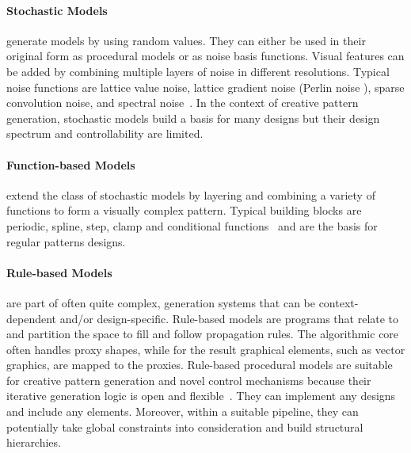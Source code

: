 \paragraph*{Stochastic Models} generate models by using random values. They can either be used in their original form as procedural models or as noise basis functions. Visual features can be added by combining multiple layers of noise in different resolutions. Typical noise functions are lattice value noise, lattice gradient noise (\eg Perlin noise \cite{perlin_1985_ais}), sparse convolution noise, and spectral noise~\cite{ebert_2003_tmp,lagae_2010_sap}. 
In the context of creative pattern generation, stochastic models build a basis for many designs but their design spectrum and controllability are limited.

\paragraph*{Function-based Models} extend the class of stochastic models by layering and combining a variety of functions to form a visually complex pattern. Typical building blocks are periodic, spline, step, clamp and conditional functions~\cite{ebert_2003_tmp} and are the basis for regular patterns designs. 


\paragraph*{Rule-based Models} are part of often quite complex, generation systems that can be context-dependent and/or design-specific. Rule-based models are programs that relate to and partition the space to fill and follow propagation rules. The algorithmic core often handles proxy shapes, while for the result graphical elements, such as vector graphics, are mapped to the proxies. Rule-based procedural models are suitable for creative pattern generation and novel control mechanisms because their iterative generation logic is open and flexible~\cite{wong_1998_cgf, mech_2012_tdf}. They can implement any designs and include any elements. Moreover, within a suitable pipeline, they can potentially take global constraints into consideration and build structural hierarchies.

